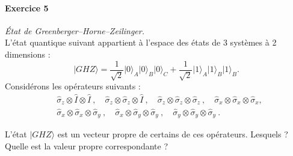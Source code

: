 \paragraph{Exercice 5} \textit{\'Etat de Greenberger–Horne–Zeilinger.} \\
L'état quantique suivant appartient à l'espace des états de 3 systèmes à 2 dimensions :
\begin{equation}
\vert GHZ \rangle = \frac{1}{\sqrt{2}}\vert 0 \rangle_A \vert 0 \rangle_B  \vert 0 \rangle_C+   \frac{1}{\sqrt{2}}\vert 1 \rangle_A \vert 1 \rangle_B \vert 1 \rangle_B .
\end{equation}
Considérons les opérateurs suivants :
\begin{equation}
\begin{split}
&\hat \sigma_z\otimes \hat I\otimes \hat I\ , \quad \hat \sigma_z\otimes \hat \sigma_z \otimes \hat I\ ,\quad \hat \sigma_z\otimes \hat \sigma_z \otimes \hat \sigma_z\ , \quad \hat \sigma_x\otimes \hat \sigma_x \otimes \hat \sigma_x,\\
&\hat \sigma_x\otimes \hat \sigma_x \otimes \hat \sigma_y\ , \quad  \hat \sigma_x\otimes \hat \sigma_y \otimes \hat \sigma_y\ , \quad  \hat \sigma_y\otimes \hat \sigma_y \otimes \hat \sigma_y\ .
\end{split}
\end{equation}


L'état $\vert GHZ \rangle $ est un vecteur propre de certains de ces opérateurs. Lesquels ? Quelle est la valeur propre correspondante ? 

\newpage
